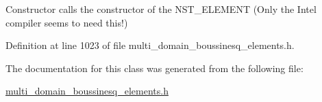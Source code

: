 Constructor calls the constructor of the N\+S\+T\+\_\+\+E\+L\+E\+M\+E\+NT (Only the Intel compiler seems to need this!) 



Definition at line 1023 of file multi\+\_\+domain\+\_\+boussinesq\+\_\+elements.\+h.



The documentation for this class was generated from the following file\+:\begin{DoxyCompactItemize}
\item 
\hyperlink{multi__domain__boussinesq__elements_8h}{multi\+\_\+domain\+\_\+boussinesq\+\_\+elements.\+h}\end{DoxyCompactItemize}
